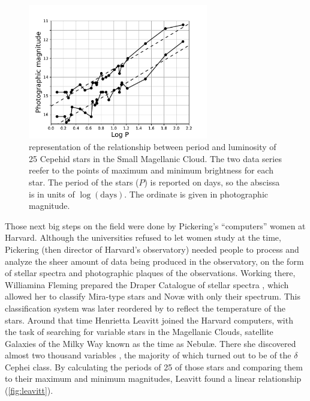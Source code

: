 \begin{figure}
	\centering
	\includegraphics[width=0.7\textwidth]{img/leavitt.pdf}
	\caption[Leavitt PL relation]{\cite{Leavitt1912} representation of the relationship between period and luminosity 
	of 25 Cepehid stars in the Small Magellanic Cloud.
	The two data series reefer to the points of maximum and minimum brightness for each star. 
	The period of the stars ($P$) is reported on days, so the abscissa is in units of $\log(\text{days})$.
	The ordinate is given in photographic magnitude.
	}
	\label{fig:leavitt}
\end{figure}

Those next big steps on the field were done by Pickering's ``computers'' women at Harvard. 
Although the universities refused to let women study at the time, Pickering (then director of Harvard's observatory) 
needed people to process and analyze the sheer amount of data being produced in the observatory, 
on the form of stellar spectra and photographic plaques of the observations.
Working there, Williamina Fleming prepared the Draper Catalogue of stellar spectra \citep{Pickering1890,Maury1897}, 
which allowed her to classify Mira-type stars and Nov\ae{} with only their spectrum. 
This classification system was later reordered by \cite{Canon1901} to reflect the temperature of the stars.
Around that time Henrietta Leavitt joined the Harvard computers, 
with the task of searching for variable stars in the Magellanic Clouds, satellite Galaxies of the Milky Way known as the time as Nebul\ae{}.
There she discovered almost two thousand variables \citep{Leavitt1908}, the majority of which turned out to be of the $\delta$ Cephei class. 
By calculating the periods of 25 of those stars and comparing them to their maximum and minimum magnitudes, Leavitt found a linear relationship (\autoref{fig:leavitt}).


